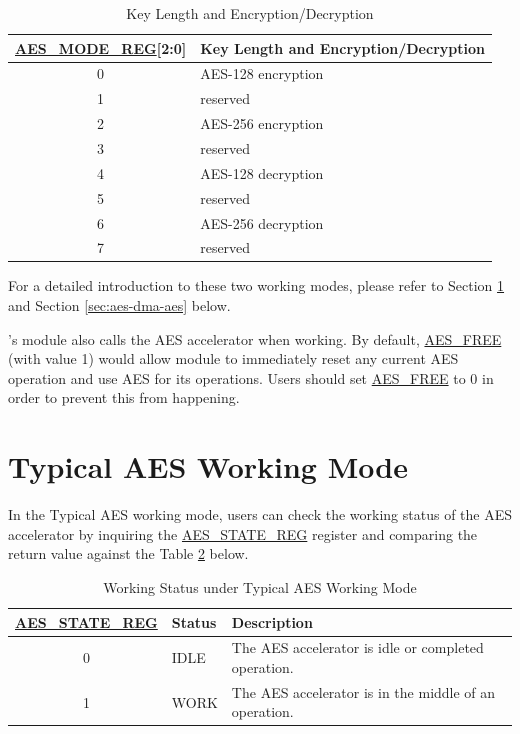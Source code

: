 \documentclass[main\_\_EN.tex]{subfiles}
\begin{document}
\begin{longtable}[c]{ | c | l | }
\caption{Key Length and Encryption/Decryption}
\label{tab:aes-operation}
\\\hline
\rowcolor{lightgray}
\textbf{\hyperref[regdesc:AESMODEREG]{AES\_MODE\_REG}[2:0] }    & \textbf{Key Length and Encryption/Decryption}\\
    \hline
    0                   & AES-128 encryption    \\
    \hline
    1                   & reserved    \\
    \hline
    2                   & AES-256 encryption    \\
    \hline
    3                   & reserved    \\
    \hline
    4                   & AES-128 decryption    \\
    \hline
    5                   & reserved    \\
    \hline
    6                   & AES-256 decryption    \\
    \hline
    7                   & reserved    \\
    \hline
\end{longtable}
For a detailed introduction to these two working modes, please refer to Section \ref{sec:aes-typical-modes} and Section \ref{sec:aes-dma-aes} below.
\begin{importantlisting}
\vspace{-0.5em}
    \chipname{}'s  module also calls the AES accelerator when working. By default, \hyperref[fielddesc:AESFREE]{AES\_FREE} (with value 1) would allow  module to immediately reset any current AES operation and use AES for its operations. Users should set \hyperref[fielddesc:AESFREE]{AES\_FREE} to 0 in order to prevent this from happening.
\end{importantlisting}



\section{Typical AES Working Mode}\label{sec:aes-typical-modes}

In the Typical AES working mode,
users can check the working status of the AES accelerator by inquiring the \hyperref[regdesc:AESSTATEREG]{AES\_STATE\_REG} register and comparing the return value against the Table \ref{tab:aes-state-value-typical} below.

\begin{longtable}[c]{ | c | l | l| }
\caption{Working Status under Typical AES Working Mode}
\label{tab:aes-state-value-typical}
\\\hline
\rowcolor{lightgray}
\textbf{\hyperref[regdesc:AESSTATEREG]{AES\_STATE\_REG}} & \textbf{Status} &  \textbf{Description} \\ \hline

    0                   & IDLE      &   The AES accelerator is idle or completed operation.\\ \hline
    1                   & WORK      &   The AES accelerator is in the middle of an operation.     \\ \hline
\end{longtable}
\end{document}
